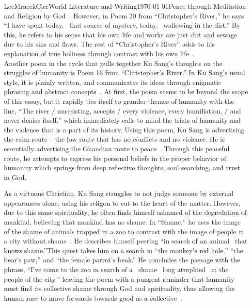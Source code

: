 \documentclass[12pt,letterpaper]{article}
\begin{document}
\begin{mla}{Lee}{Mracek}{Cler}{World Literature and Writing}{\today}{Peace through Meditation and Religion}
    by God~\parencite{churches}. However, in Poem 20 from ``Christopher's River,'' he says ``I have spent today, \ that source of mystery, today, \ wallowing in the dirt.''
    By this, he refers to his sense that his own life and works are just dirt and sewage due to his sins and flaws. The rest of ``Christopher's River'' adds to his explanation of true holiness through contrast with his own life~\parencite{bong-goon}. \\
    Another poem in the cycle that pulls together Ku Sang's thoughts on the struggles of humanity is Poem 16 from ``Christopher's River.'' In Ku Sang's usual style, it is plainly written, and communicates its ideas through enigmatic phrasing and abstract concepts~\parencite{taize}. At first, the poem seems to be beyond the scope of this essay, but it rapidly ties itself to grander themes of humanity with the line, ``The river / unresisting, accepts / every violence, every humiliation, / and
    never denies itself,'' which immediately calls to mind the trials of humanity and the violence that is a part of its history. Using this poem, Ku Sang is advertising the calm route -- the low route that has no conflicts and no violence. He is essentially advertising the Ghandian route to peace~\parencite{taize}. Through this peaceful route, he attempts to express his personal beliefs in the proper behavior of humanity which springs from deep
    reflective thoughts, soul searching, and trust in God.\\
    As a virtuous Christian, Ku Sang struggles to not judge someone by external appearances alone, using his religon to cut to the heart of the matter. However, due to this same spirituality, he often finds himself ashamed of the degredation of mankind, believing that mankind has no shame. In ``Shame,'' he uses the image of the shame of animals trapped in a zoo to contrast with the image of people in a city without shame~\parencite{bong-goon}. He describes himself peering ``in search of an animal \
    that knows shame.''This quest takes him on a search in ``the monkey's red hole,'' ``the bear's paw,'' and ``the female parrot's beak.'' He concludes the passage with the phrase, ``I've come to the zoo in search of a \ shame \ long atrophied \ in the people of the city,'' leaving the poem with a pungent reminder that humanity must find its collective shame through God and spirituality, thus allowing the human race to move forwards towards good as a
    collective~\parencite{koreanlit}. \\

\end{mla}
\end{document}
